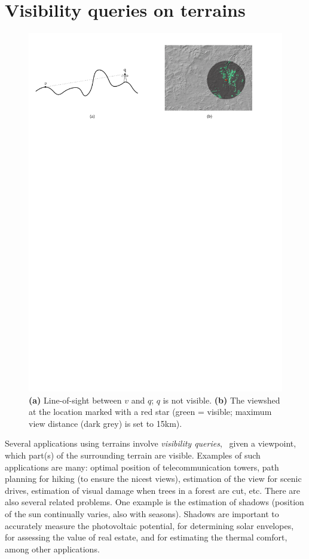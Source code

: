 
\graphicspath{{visibility/}}

\chapter{Visibility queries on terrains}

\begin{figure}[ht]
  \centering
  \includegraphics[width=\linewidth]{figs/overview_los_viewshed.pdf}
  \caption{\textbf{(a)} Line-of-sight between $v$ and $q$; $q$ is not visible. \textbf{(b)} The viewshed at the location marked with a red star (green = visible; maximum view distance (dark grey) is set to 15km).}
\label{fig:overview_los_viewshed}
\end{figure}

Several applications using terrains involve \emph{visibility queries}, \ie\ given a viewpoint, which part(s) of the surrounding terrain are visible.
Examples of such applications are many: optimal position of telecommunication towers, path planning for hiking (to ensure the nicest views), estimation of the view for scenic drives, estimation of visual damage when trees in a forest are cut, etc.
There are also several related problems.
One example is the estimation of shadows (position of the sun continually varies, also with seasons).
Shadows are important to accurately measure the photovoltaic potential, for determining solar envelopes, for assessing the value of real estate, and for estimating the thermal comfort, among other applications.


